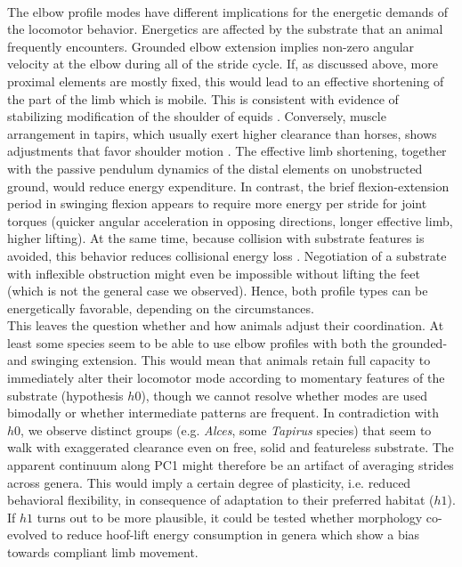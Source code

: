 \documentclass[10pt, a4paper]{article}
\begin{document}
\begin{linenumbers}[1]
\\The elbow profile modes have different implications for the energetic demands of the locomotor behavior. 
Energetics are affected by the substrate that an animal frequently encounters. 
Grounded elbow extension implies non-zero angular velocity at the elbow during all of the stride cycle. 
If, as discussed above, more proximal elements are mostly fixed, this would lead to an effective shortening of the part of the limb which is mobile. 
This is consistent with evidence of stabilizing modification of the shoulder of equids \citep[][]{Hermanson1992}. 
Conversely, muscle arrangement in tapirs, which usually exert higher clearance than horses, shows adjustments that favor shoulder motion \citep{MacLaren2016}. 
The effective limb shortening, together with the passive pendulum dynamics of the distal elements on unobstructed ground, would reduce energy expenditure. 
In contrast, the brief flexion-extension period in swinging flexion appears to require more energy per stride for joint torques (quicker angular acceleration in opposing directions, longer effective limb, higher lifting). 
At the same time, because collision with substrate features is avoided, this behavior reduces collisional energy loss \citep[i.e. loss from collision with superficial vegetation or rubble, which has to be distinguished from the collisional models in][]{Ruina2005}. 
Negotiation of a substrate with inflexible obstruction might even be impossible without lifting the feet (which is not the general case we observed). 
Hence, both profile types can be energetically favorable, depending on the circumstances. 
\\This leaves the question whether and how animals adjust their coordination. 
At least some species seem to be able to use elbow profiles with both the grounded- and swinging extension. 
This would mean that animals retain full capacity to immediately alter their locomotor mode according to momentary features of the substrate (hypothesis $h0$), though we cannot resolve whether modes are used bimodally or whether intermediate patterns are frequent. 
In contradiction with $h0$, we observe distinct groups (e.g. \textit{Alces}, some \textit{Tapirus} species) that seem to walk with exaggerated clearance even on free, solid and featureless substrate. 
The apparent continuum along PC1 might therefore be an artifact of averaging strides across genera. 
This would imply a certain degree of plasticity, i.e. reduced behavioral flexibility, in consequence of adaptation to their preferred habitat ($h1$). 
If $h1$ turns out to be more plausible, it could be tested whether morphology co-evolved to reduce hoof-lift energy consumption in genera which show a bias towards compliant limb movement. 

\end{linenumbers}
\end{document}

